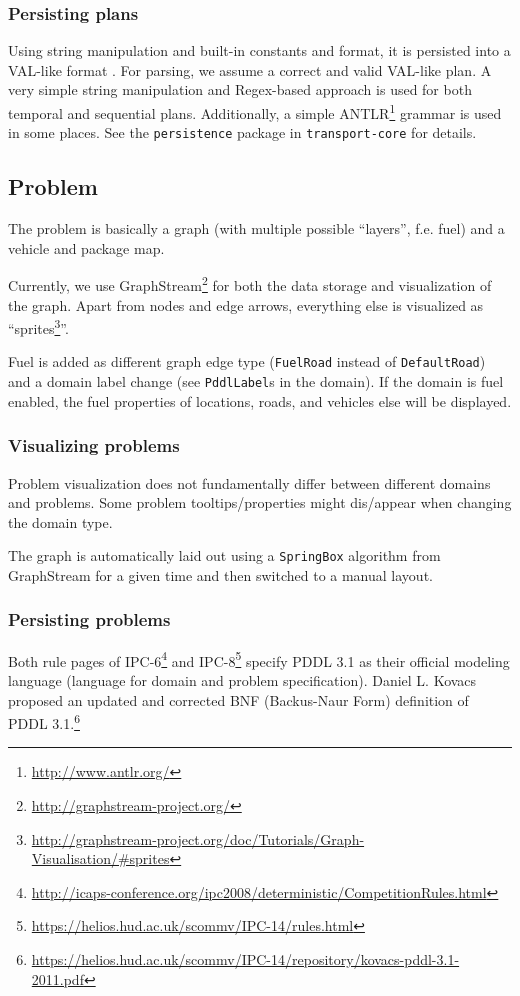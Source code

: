 \subsubsection*{Persisting plans}
Using string manipulation and built-in constants and format, it is persisted into a VAL-like format \citep[Figure~2]{Howey2003}.
For parsing, we assume a correct and valid VAL-like plan. A very simple string manipulation and Regex-based approach
is used for both temporal and sequential plans. Additionally, a simple ANTLR\footnote{\url{http://www.antlr.org/}} grammar
is used in some places. See the \texttt{persistence} package in \verb+transport-core+ for details.

\subsection*{Problem}
The problem is basically a graph (with multiple possible ``layers'', f.e. fuel) and a vehicle and package map.

Currently, we use GraphStream\footnote{\url{http://graphstream-project.org/}} for both the data storage and visualization of the graph.
Apart from nodes and edge arrows, everything else is visualized as
``sprites\footnote{\url{http://graphstream-project.org/doc/Tutorials/Graph-Visualisation/\#sprites}}''.

Fuel is added as different graph edge type (\verb+FuelRoad+ instead of \verb+DefaultRoad+) and a domain label change
(see \verb+PddlLabel+s in the domain).
If the domain is fuel enabled, the fuel properties of locations, roads, and vehicles else will be displayed.

\subsubsection*{Visualizing problems}

Problem visualization does not fundamentally differ between different domains and problems.
Some problem tooltips/properties might dis/appear when changing the domain type.

The graph is automatically laid out using a \texttt{SpringBox} algorithm from GraphStream
for a given time and then switched to a manual layout.

\subsubsection*{Persisting problems}
Both rule pages of IPC-6\footnote{\url{http://icaps-conference.org/ipc2008/deterministic/CompetitionRules.html}}
and IPC-8\footnote{\url{https://helios.hud.ac.uk/scommv/IPC-14/rules.html}}
specify PDDL 3.1 as their official modeling language (language for domain
and problem specification).
Daniel L. Kovacs proposed an updated and corrected BNF (Backus-Naur Form)
definition of PDDL 3.1.\footnote{\url{https://helios.hud.ac.uk/scommv/IPC-14/repository/kovacs-pddl-3.1-2011.pdf}}

